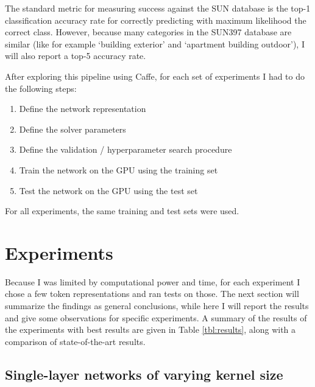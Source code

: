 \documentclass[10pt]{article}
\begin{document}
The standard metric for measuring success against the SUN database is the top-1 classification accuracy rate for correctly predicting with maximum likelihood the correct class. However, because many categories in the SUN397 database are similar (like for example `building exterior' and `apartment building outdoor'), I will also report a top-5 accuracy rate.

After exploring this pipeline using Caffe, for each set of experiments I had to do the following steps: 

\begin{enumerate}
	\item Define the network representation
	\item Define the solver parameters
	\item Define the validation / hyperparameter search procedure
	\item Train the network on the GPU using the training set
	\item Test the network on the GPU using the test set
\end{enumerate}

For all experiments, the same training and test sets were used. 

\section{Experiments}

Because I was limited by computational power and time, for each experiment I chose a few token representations and ran tests on those. The next section will summarize the findings as general conclusions, while here I will report the results and give some observations for specific experiments. A summary of the results of the experiments with best results are given in Table \ref{tbl:results}, along with a comparison of state-of-the-art results.

\begin{table}[!ht]
\centering
{}
\caption{Summary of top-1 and top-5 accuracy results on the test set}
\label{tbl:results}
\end{table}

\subsection{Single-layer networks of varying kernel size}
\end{document}
